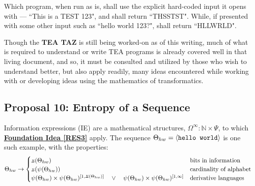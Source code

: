 \documentclass[12pt,a4paper]{article}
\newcommand{\invpi}[1]{\mathop{\rotatebox[origin=c]{180}{$\pi$}}#1}
\begin{document}
 Which program, when run as is, shall use the explicit hard-coded input it opens with --- ``This is a TEST 123", and shall return ``THSSTST". While, if presented with some other input such as ``hello world 123?", shall return ``HLLWRLD".
 
 Though the \textbf{TEA TAZ}\cite{Lutalo2024TEATAZ} is still being worked-on as of this writing, much of what is required to understand or write TEA programs is already covered well in that living document, and so, it must be consulted and utilized by those who wish to understand better, but also apply readily, many ideas encountered while working with or developing ideas using the mathematics of transformatics.


\subsection{Proposal 10: Entropy of a Sequence\cite{lnspaper}}
\label{PROPTOE}

Information expressions (IE)\cite{lnspaper} are a mathematical structures, $\Omega^\infty : \mathbb{N} \times \Psi$, to which \textbf{\hyperref[RES3]{Foundation Idea \ref{RES3}}} apply. The sequence $\Theta_{hw} = \langle \text{\texttt{hello world}} \rangle$ is one such example, with the properties:\\

\begin{equation}
\Theta_{hw} \rightarrow \begin{cases}
\invpi(\Theta_{hw}) & \text{bits in information}\\
\invpi(\psi(\Theta_{hw})) & \text{cardinality of alphabet}\\
\psi(\Theta_{hw}) \times \psi(\Theta_{hw})^{[1,\invpi(\Theta_{hw})]} \quad \lor \quad \psi(\Theta_{hw}) \times \psi(\Theta_{hw})^{[1,\infty]} & \text{derivative languages}\\
\end{cases}
\end{equation}




\end{document}
